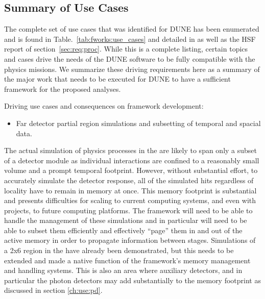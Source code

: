 \documentclass[../main-v1.tex]{subfiles}
\begin{document}
\subsection{Summary of Use Cases}

The complete set of use cases that was identified for DUNE has been enumerated and is found in Table.~\ref{tab:fworks:use_cases} and detailed in \cite{bib:docdb21934} as well as the HSF report of section~\ref{sec:req:proc}.  While this is a complete listing, certain topics and cases drive the needs of the DUNE software to be fully compatible with the physics missions.   We summarize these driving requirements here as a summary of the major work that needs to be executed for DUNE to have a sufficient framework for the proposed analyses.


Driving use cases and consequences on framework development:


\begin{itemize}
\item Far detector partial region simulations and subsetting of temporal and spacial data.
\end{itemize}

The actual simulation of physics processes in the  are likely to span only a subset of a detector module as individual interactions are confined to a reasonably small volume and a prompt temporal footprint.  However, without substantial effort, to accurately simulate the detector response, all of the simulated hits regardless of locality have to remain in memory at once.  This memory footprint is substantial and presents difficulties for scaling to current computing systems, and even with projects, to future computing platforms.  The framework will need to be able to handle the management of these simulations and in particular will need to be able to subset them efficiently and effectively ``page'' them in and out of the active memory in order to propagate information between stages.  Simulations of a 2x6  region in the  have already been demonstrated, but this needs to be extended and made a native function of the framework's memory management and handling systems.  This is also an area where auxiliary detectors, and in particular the photon detectors may add substantially to the memory footprint as discussed in section \ref{ch:use:pd}. 
\end{document}
